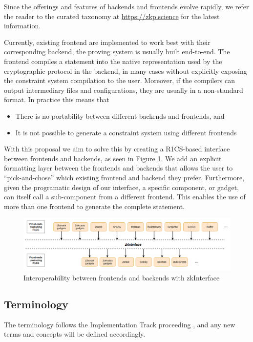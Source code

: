 \documentclass[a4paper,12pt]{article}
\begin{document}
Since the offerings and features of backends and frontends evolve rapidly, we refer the reader to the curated taxonomy at \url{https://zkp.science} for the latest information.  

Currently, existing frontend are implemented to work best with their corresponding backend, the proving system is usually built end-to-end. The frontend compiles a statement into the native representation used by the cryptographic protocol in the backend, in many cases without explicitly exposing the constraint system compilation to the user. Moreover, if the compilers can output intermediary files and configurations, they are usually in a non-standard format. In practice this means that
\begin{itemize}
	\item There is no portability between different backends and frontends, and
	\item It is not possible to generate a constraint system using different frontends
\end{itemize}   

With this proposal we aim to solve this by creating a R1CS-based interface between frontends and backends, as seen in Figure \ref{interface}. We add an explicit formatting layer between the frontends and backends that allows the user to ``pick-and-chose'' which existing frontend and backend they prefer. Furthermore, given the programatic design of our interface, a specific component, or gadget, can itself call a sub-component from a different frontend. This enables the use of more than one frontend to generate the complete statement.

\begin{figure}[h!]
	\includegraphics[width=\linewidth]{graphics/interop.png}
	\caption{Interoperability between frontends and backends with zkInterface}
	\label{interface}
\end{figure}

\subsection{Terminology}
The terminology follows the Implementation Track proceeding \cite{ZKProofImplementation}, and any new terms and concepts will be defined accordingly.
\end{document}
